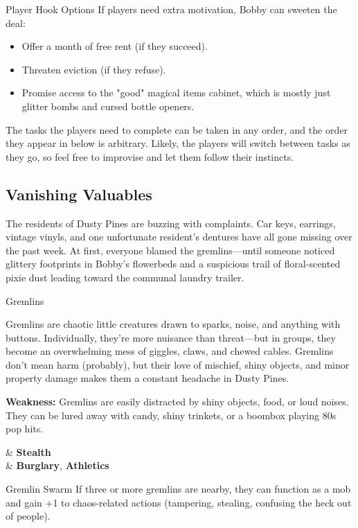\begin{CommentBox}{Player Hook Options}
    If players need extra motivation, Bobby can sweeten the deal:
    \begin{itemize}
        \item Offer a month of free rent (if they succeed).
        \item Threaten eviction (if they refuse).
        \item Promise access to the "good" magical items cabinet, which is mostly just glitter bombs and cursed bottle openers.
    \end{itemize}
\end{CommentBox}

The tasks the players need to complete can be taken in any order, and the order they appear in below is arbitrary. Likely, the players will switch between tasks as they go, so feel free to improvise and let them follow their instincts.

\subsection{Vanishing Valuables}

The residents of Dusty Pines are buzzing with complaints. Car keys, earrings, vintage vinyls, and one unfortunate resident’s dentures have all gone missing over the past week. At first, everyone blamed the gremlins—until someone noticed glittery footprints in Bobby’s flowerbeds and a suspicious trail of floral-scented pixie dust leading toward the communal laundry trailer.


\begin{NPC}[description={Mischievous, Tiny, Swarmable}]{Gremlins}

    Gremlins are chaotic little creatures drawn to sparks, noise, and anything with buttons. Individually, they’re more nuisance than threat—but in groups, they become an overwhelming mess of giggles, claws, and chewed cables. Gremlins don’t mean harm (probably), but their love of mischief, shiny objects, and minor property damage makes them a constant headache in Dusty Pines.

    \textbf{Weakness:} Gremlins are easily distracted by shiny objects, food, or loud noises. They can be lured away with candy, shiny trinkets, or a boombox playing 80s pop hits.

    \vspace{0.5\baselineskip}
    \begin{SkillsBox}
        \Skilled & \textbf{Stealth} \\
        \Novice  & \textbf{Burglary}, \textbf{Athletics}
    \end{SkillsBox}

    \begin{TraitsBox}
        \item[Gremlin Swarm] If three or more gremlins are nearby, they can function as a mob and gain +1 to chaos-related actions (tampering, stealing, confusing the heck out of people).
    \end{TraitsBox}

    \DamageBox[%
        totalfatigue=2,%
        totalmild=0,totalmoderate=0,totalsevere=0,%
    ]
\end{NPC}

